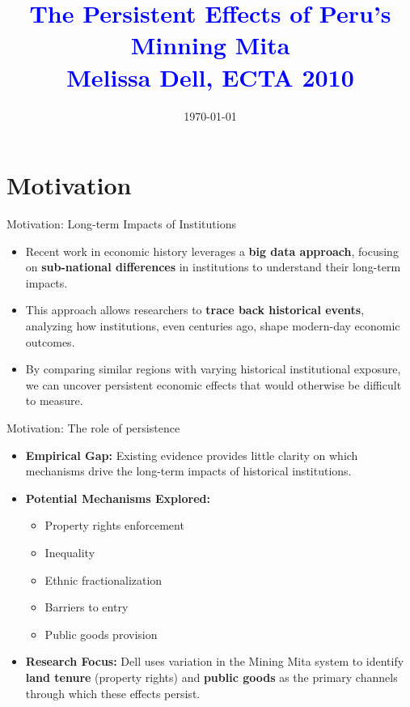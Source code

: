 \documentclass[notes,11pt, aspectratio=169]{beamer}
\title[]{\textcolor{blue}{The Persistent Effects of Peru's Minning Mita \\ Melissa Dell, ECTA 2010} }
\author[PGP]{}
\institute[CUNY]{\small{\begin{tabular}{c}
Jesus Lopez  \\
 The Graduate Center \\ \\

\multicolumn{3}{c}{CUNY} \\
\end{tabular}}}
\date{\today}
\begin{document}
\begin{frame}
\maketitle
\end{frame}

\section{Motivation}

\begin{frame}{Motivation: Long-term Impacts of Institutions}
    \begin{itemize}
        \item Recent work in economic history leverages a \textbf{big data approach}, focusing on \textbf{sub-national differences} in institutions to understand their long-term impacts.
        \item This approach allows researchers to \textbf{trace back historical events}, analyzing how institutions, even centuries ago, shape modern-day economic outcomes.
        \item By comparing similar regions with varying historical institutional exposure, we can uncover persistent economic effects that would otherwise be difficult to measure.
    \end{itemize}
\end{frame}

\begin{frame}{Motivation: The role of persistence}
        \begin{itemize}
        \item \textbf{Empirical Gap:} Existing evidence provides little clarity on which mechanisms drive the long-term impacts of historical institutions.
        \item \textbf{Potential Mechanisms Explored:}
            \begin{itemize}
                \item Property rights enforcement
                \item Inequality
                \item Ethnic fractionalization
                \item Barriers to entry
                \item Public goods provision
            \end{itemize}
        \item \textbf{Research Focus:} 
            Dell uses variation in the Mining Mita system to identify \textbf{land tenure} (property rights) and \textbf{public goods} as the primary channels through which these effects persist.
    \end{itemize}
\end{frame}
\end{document}
